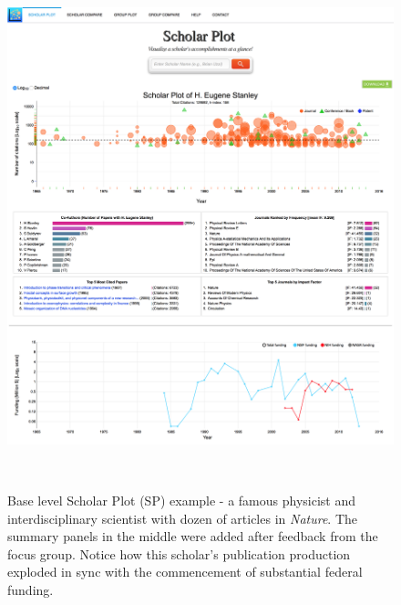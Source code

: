 \begin{figure}
    \centering
    \includegraphics[width=1\textwidth]{figures/fig-Eugene-with-menu}
    \caption{Base level Scholar Plot (SP) example - a famous physicist and interdisciplinary scientist with dozen of articles in \emph{Nature}. The summary panels in the middle were added after feedback from the focus group. Notice how this scholar's publication production exploded in sync with the commencement of substantial federal funding.}~\label{fig-publication} 
\end{figure} 

